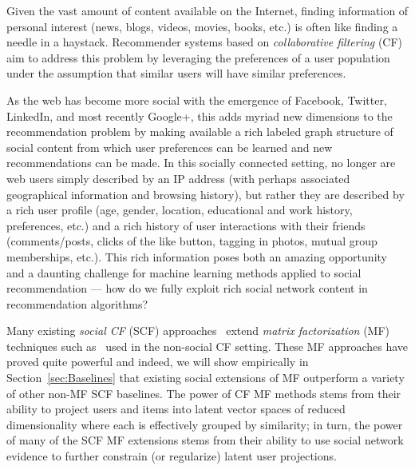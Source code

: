 Given the vast amount of content available on the Internet, finding
information of personal interest (news, blogs, videos, movies, books,
etc.) is often like finding a needle in a haystack.  Recommender
systems based on \emph{collaborative filtering}
(CF)~\cite{collab_filtering} aim to address this problem by leveraging
the preferences of a user population under the assumption that similar
users will have similar preferences.

As the web has become more social with the emergence of Facebook,
Twitter, LinkedIn, and most recently Google+, this adds myriad new
dimensions to the recommendation problem by making available a rich
labeled graph structure of social content from which user preferences
can be learned and new recommendations can be made.  In this socially
connected setting, no longer are web users simply described by an IP
address (with perhaps associated geographical information and browsing
history), but rather they are described by a rich user profile (age,
gender, location, educational and work history, preferences, etc.)
and a rich history of user interactions with their friends (comments/posts, 
clicks of the like button, tagging in photos, mutual group
memberships, etc.).  This rich information poses both an amazing
opportunity and a daunting challenge for machine learning methods
applied to social recommendation --- how do we fully exploit rich social
network content in recommendation algorithms?

Many existing \emph{social CF} (SCF)
approaches~\cite{ste,sorec,lla,socinf,sr,rrmf} extend \emph{matrix
factorization} (MF) techniques such as~\cite{pmf} used
in the non-social CF setting.
These MF approaches have proved quite powerful and indeed, we will
show empirically in Section~\ref{sec:Baselines} that existing social
extensions of MF outperform a variety of other non-MF SCF baselines.  The
power of CF MF methods stems from their ability to project users
and items into latent vector spaces of reduced dimensionality where
each is effectively grouped by similarity; in turn, the power of many
of the SCF MF extensions stems
from their ability to use social network evidence to further
constrain (or regularize) latent user projections.

